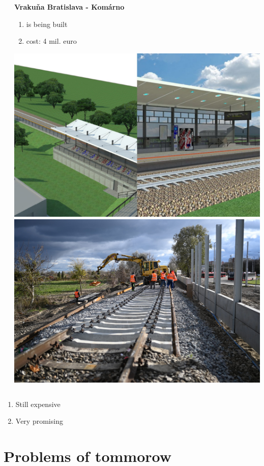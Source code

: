 \begin{frame}
\begin{columns}
\begin{column}{.32\textwidth}
		\end{column}
		\begin{column}{.32\textwidth}
			\textbf{Vrakuňa Bratislava - Komárno}\\
			\begin{enumerate}
				\item is being built
				\item cost: 4 mil. euro
			\end{enumerate}
			\vspace{1em}
			\centering
			\includegraphics[width=.7\textwidth]{images/tiop-vrakuna-render}	\\
			\includegraphics[width=.7\textwidth]{images/tiop-vrakuna}
		\end{column}
	\end{columns}

	\begin{enumerate}
		\item Still expensive
		\item Very promising
	\end{enumerate}
\end{frame}

\section{Problems of tommorow}

